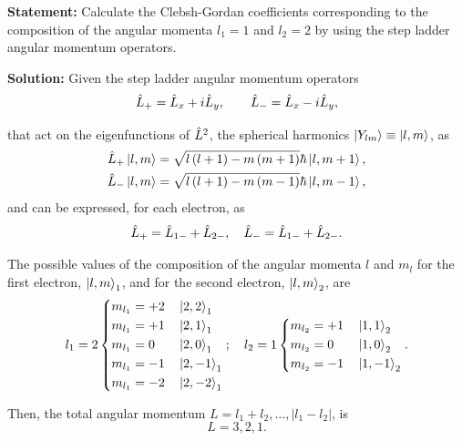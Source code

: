 \graphicspath{{./figuras/}}
\textbf{Statement:} Calculate the Clebsh-Gordan coefficients corresponding to the composition of the
angular momenta $l_1 = 1$ and $l_2 = 2$ by using the step ladder angular momentum operators.\\ \vspace{1em}

\textbf{Solution:} Given the step ladder angular momentum operators
\begin{equation}\label{eq:ladder_operators}
    \hat{L}_{+} = \hat{L}_x + i \hat{L}_y , \qquad \hat{L}_{-} = \hat{L}_x - i \hat{L}_y,
\end{equation}

that act on the eigenfunctions of $\hat{L}^{2}$, the spherical harmonics $\Ket{Y_{lm}} \equiv \Ket{l,m}$, as 
\begin{align}
    \hat{L}_{+} \Ket{l, m} &= \sqrt{l\left( l + 1 \right) - m\left( m + 1 \right)} \hbar \Ket{l, m+1}, \label{eq:l_mas} \\
    \hat{L}_{-} \Ket{l, m} &= \sqrt{l\left( l + 1 \right) - m\left( m - 1 \right)} \hbar \Ket{l, m-1}, \label{eq:l_menos}
\end{align}
and can be expressed, for each electron, as 
\begin{equation}\label{eq:separation_lad_op}
    \hat{L}_{+} = \hat{L}_{1-} + \hat{L}_{2-} ,
    \quad
    \hat{L}_{-} = \hat{L}_{1-} + \hat{L}_{2-}.
\end{equation}
 
The possible values of the composition of the angular momenta $l$ and $m_l$ for the first electron, $\Ket{l,m}_1$,
and for the second electron, $\Ket{l,m}_2$, are 
\begin{equation}
    l_1 = 2
    \begin{dcases}
        m_{l_1} = +2 & \, \Ket{2,2}_1  \\
        m_{l_1} = +1 & \, \Ket{2,1}_1  \\
        m_{l_1} = 0  & \, \Ket{2,0}_1  \\
        m_{l_1} = -1 & \, \Ket{2,-1}_1 \\
        m_{l_1} = -2 & \, \Ket{2,-2}_1
    \end{dcases}
    ; \quad 
    l_2 = 1
    \begin{dcases}
        m_{l_2} = +1 & \, \Ket{1,1}_2  \\
        m_{l_2} = 0  & \, \Ket{1,0}_2  \\
        m_{l_2} = -1 & \, \Ket{1,-1}_2
    \end{dcases}
    .
\end{equation}

Then, the total angular momentum $L = l_1 + l_2, \ldots, \left| l_1 - l_2 \right|$, is 
\begin{equation}
    L = 3,2,1.
\end{equation}

